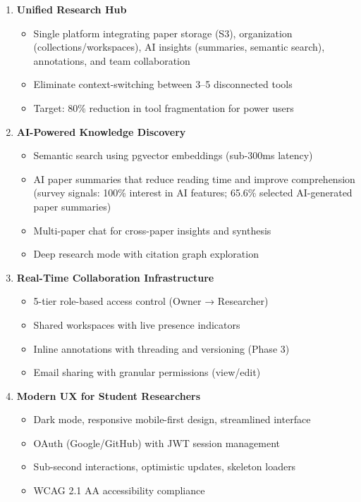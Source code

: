 \begin{enumerate}
    \item \textbf{Unified Research Hub}
          \begin{itemize}
              \item Single platform integrating paper storage (S3), organization (collections/workspaces), AI insights (summaries, semantic search), annotations, and team collaboration
              \item Eliminate context-switching between 3--5 disconnected tools
              \item Target: 80\% reduction in tool fragmentation for power users
          \end{itemize}

    \item \textbf{AI-Powered Knowledge Discovery}
          \begin{itemize}
              \item Semantic search using pgvector embeddings (sub-300ms latency)
              \item AI paper summaries that reduce reading time and improve comprehension (survey signals: 100\% interest in AI features; 65.6\% selected AI-generated paper summaries)
              \item Multi-paper chat for cross-paper insights and synthesis
              \item Deep research mode with citation graph exploration
          \end{itemize}

    \item \textbf{Real-Time Collaboration Infrastructure}
          \begin{itemize}
              \item 5-tier role-based access control (Owner → Researcher)
              \item Shared workspaces with live presence indicators
              \item Inline annotations with threading and versioning (Phase 3)
              \item Email sharing with granular permissions (view/edit)
          \end{itemize}

    \item \textbf{Modern UX for Student Researchers}
          \begin{itemize}
              \item Dark mode, responsive mobile-first design, streamlined interface
              \item OAuth (Google/GitHub) with JWT session management
              \item Sub-second interactions, optimistic updates, skeleton loaders
              \item WCAG 2.1 AA accessibility compliance
          \end{itemize}


\end{enumerate}
